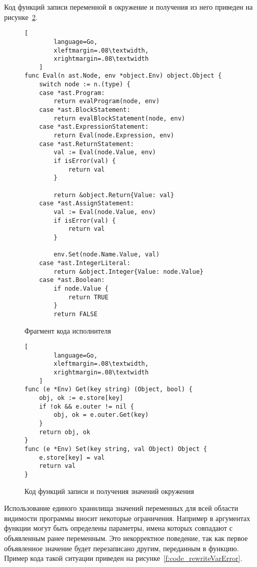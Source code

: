 Код функций записи переменной в окружение и получения из него приведен на рисунке~\ref{f:code_getsetEnv}.

\clearpage

\begin{figure}[!htb]
	\centering
	\begin{lstlisting}[
        language=Go,
        xleftmargin=.08\textwidth,
        xrightmargin=.08\textwidth
    ]
func Eval(n ast.Node, env *object.Env) object.Object {
    switch node := n.(type) {
    case *ast.Program:
        return evalProgram(node, env)
    case *ast.BlockStatement:
        return evalBlockStatement(node, env)
    case *ast.ExpressionStatement:
        return Eval(node.Expression, env)
    case *ast.ReturnStatement:
        val := Eval(node.Value, env)
        if isError(val) {
            return val
        }

        return &object.Return{Value: val}
    case *ast.AssignStatement:
        val := Eval(node.Value, env)
        if isError(val) {
            return val
        }

        env.Set(node.Name.Value, val)
    case *ast.IntegerLiteral:
        return &object.Integer{Value: node.Value}
    case *ast.Boolean:
        if node.Value {
            return TRUE
        }
        return FALSE
\end{lstlisting}
	\caption{Фрагмент кода исполнителя}
	\label{f:code_evalFragment}
\end{figure}

\begin{figure}[!htb]
	\centering
	\begin{lstlisting}[
        language=Go,
        xleftmargin=.08\textwidth,
        xrightmargin=.08\textwidth
    ]
func (e *Env) Get(key string) (Object, bool) {
    obj, ok := e.store[key]
    if !ok && e.outer != nil {
        obj, ok = e.outer.Get(key)
    }
    return obj, ok
}
func (e *Env) Set(key string, val Object) Object {
    e.store[key] = val
    return val
}    
\end{lstlisting}
	\caption{Код функций записи и получения значений окружения}
	\label{f:code_getsetEnv}
\end{figure}

\clearpage


Использование единого хранилища значений переменных для всей области видимости программы вносит некоторые ограничения.
Например в аргументах функции могут быть определены параметры, имена которых совпадают с объявленным ранее переменным.
Это некорректное поведение, так как первое объявленное значение будет перезаписано другим, переданным в функцию.
Пример кода такой ситуации приведен на рисунке~\ref{f:code_rewriteVarError}.

